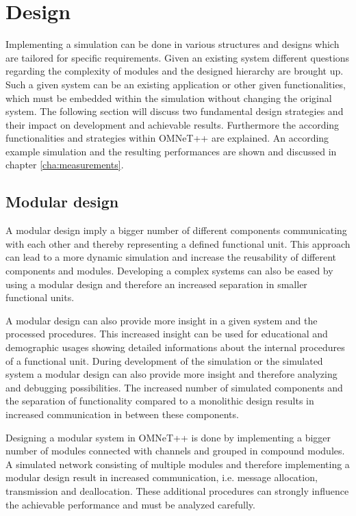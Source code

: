 \chapter{Design}
\label{cha:design}
Implementing a simulation can be done in various structures and designs which are tailored for specific requirements.
Given an existing system different questions regarding the complexity of modules and the designed hierarchy are brought up.
Such a given system can be an existing application or other given functionalities, which must be embedded within the simulation without changing the original system.
The following section will discuss two fundamental design strategies and their impact on development and achievable results.
Furthermore the according functionalities and strategies within OMNeT++ are explained.
An according example simulation and the resulting performances are shown and discussed in chapter \ref{cha:measurements}.

\section{Modular design}
\label{sec:design_modular}
A modular design imply a bigger number of different components communicating with each other and thereby representing a defined functional unit.
This approach can lead to a more dynamic simulation and increase the reusability of different components and modules.
Developing a complex systems can also be eased by using a modular design and therefore an increased separation in smaller functional units.

A modular design can also provide more insight in a given system and the processed procedures.
This increased insight can be used for educational and demographic usages showing detailed informations about the internal procedures of a functional unit.
During development of the simulation or the simulated system a modular design can also provide more insight and therefore analyzing and debugging possibilities.
The increased number of simulated components and the separation of functionality compared to a monolithic design results in increased communication in between these components.

Designing a modular system in OMNeT++ is done by implementing a bigger number of modules connected with channels and grouped in compound modules.
A simulated network consisting of multiple modules and therefore implementing a modular design result in increased communication, i.e. message allocation, transmission and deallocation.
These additional procedures can strongly influence the achievable performance and must be analyzed carefully.

